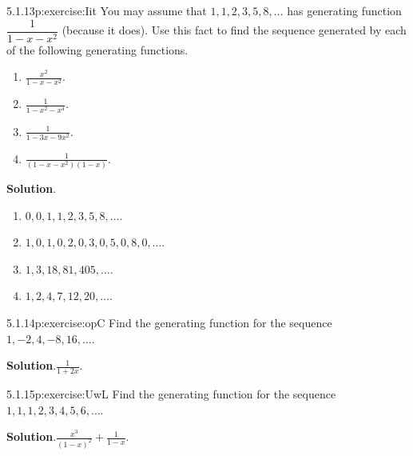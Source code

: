 \documentclass[twoside,11pt,]{book}
\newcommand{\blocktitlefont}{\relax}
\numberwithin{equation}{chapter}
\begin{document}
\begin{divisionsolution}{5.1.13}{}{p:exercise:Iit}%
You may assume that \(1, 1, 2, 3, 5, 8,\ldots\) has generating function \(\dfrac{1}{1-x-x^2}\) (because it does). Use this fact to find the sequence generated by each of the following generating functions.%
\begin{enumerate}[label=(\alph*)]
\item{}\(\frac{x^2}{1-x-x^2}\).%
\item{}\(\frac{1}{1-x^2-x^4}\).%
\item{}\(\frac{1}{1-3x-9x^2}\).%
\item{}\(\frac{1}{(1-x-x^2)(1-x)}\).%
\end{enumerate}
%
\par\smallskip%
\noindent\textbf{\blocktitlefont Solution}.\quad{}%
\begin{enumerate}[label=(\alph*)]
\item{}\(0,0,1,1,2,3,5,8, \ldots\).%
\item{}\(1, 0, 1, 0, 2, 0, 3, 0, 5, 0, 8, 0, \ldots\).%
\item{}\(1, 3, 18, 81, 405, \ldots\).%
\item{}\(1, 2, 4, 7, 12, 20, \ldots\).%
\end{enumerate}
%
\end{divisionsolution}%
\begin{divisionsolution}{5.1.14}{}{p:exercise:opC}%
Find the generating function for the sequence \(1, -2, 4, -8, 16, \ldots\).%
\par\smallskip%
\noindent\textbf{\blocktitlefont Solution}.\quad{}\(\frac{1}{1+2x}\).%
\end{divisionsolution}%
\begin{divisionsolution}{5.1.15}{}{p:exercise:UwL}%
Find the generating function for the sequence \(1, 1, 1, 2, 3, 4, 5, 6, \ldots\).%
\par\smallskip%
\noindent\textbf{\blocktitlefont Solution}.\quad{}\(\frac{x^3}{(1-x)^2} + \frac{1}{1-x}\).%
\end{divisionsolution}%
\end{document}
